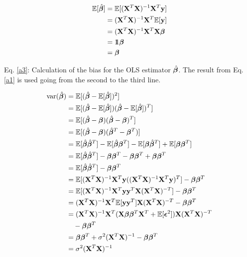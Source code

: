 \begin{align}\label{a3}
    \fv{\hat{\bet}} & = \fv{(\mathbf{X}^T\mathbf{X})^{-1}\mathbf{X}^T \y} \nonumber \\ 
    & = (\mathbf{X}^T\mathbf{X})^{-1}\mathbf{X}^T \fv{\y} \nonumber \\ 
    & = (\mathbf{X}^T\mathbf{X})^{-1}\mathbf{X}^T \mathbf{X}\bet \nonumber \\
    & = \unit \bet \nonumber \\
    & = \bet 
\end{align}

Eq. \ref{a3}: Calculation of the bias for the OLS estimator $\hat{\bet}$. The result from Eq. \ref{a1} is used going from the second to the third line.

\begin{align}\label{a4}
    \text{var}(\hat{\bet}) & = \fv{(\hat{\bet}-\fv{\hat{\bet}})^2} \nonumber \\
    & = \fv{(\hat{\bet}-\fv{\hat{\bet}})(\hat{\bet}-\fv{\hat{\bet}})^T} \nonumber \\ 
    & = \fv{(\hat{\bet}-\bet)(\hat{\bet}-\bet)^T} \nonumber \\ 
    & = \fv{(\hat{\bet}-\bet)(\hat{\bet}^T-\bet^T)} \nonumber \\
    & = \fv{\hat{\bet}\hat{\bet}^T} - \fv{\hat{\bet}\bet^T} - \fv{\bet \hat{\bet}^T} + \fv{\bet \bet^T} \nonumber \\
    & = \fv{\hat{\bet}\hat{\bet}^T} - \bet\bet^T - \bet\bet^T + \bet\bet^T \nonumber \\
    & = \fv{\hat{\bet}\hat{\bet}^T} - \bet\bet^T \nonumber \\
    & = \fv{\betta(\betta)^T} - \bet\bet^T \nonumber \\
    & = \fv{\betta \y^T \mathbf{X}(\mathbf{X}^T\mathbf{X})^{-T}} - \bet\bet^T \nonumber \\
    & = (\mathbf{X}^T\mathbf{X})^{-1}\mathbf{X}^T\fv{\y\y^T}\mathbf{X}(\mathbf{X}^T\mathbf{X})^{-T} - \bet\bet^T \nonumber \\
    & = (\mathbf{X}^T\mathbf{X})^{-1}\mathbf{X}^T(\mathbf{X}\bet \bet^T \mathbf{X}^T + \fv{\boldsymbol{\epsilon}^2})\mathbf{X}(\mathbf{X}^T\mathbf{X})^{-T} \nonumber \\ 
    & \quad - \bet\bet^T \nonumber \\
    & = \bet \bet^T + \sigma^2 (\mathbf{X}^T\mathbf{X})^{-1} - \bet \bet^T \nonumber \\
    & = \sigma^2 (\mathbf{X}^T\mathbf{X})^{-1}
\end{align}

